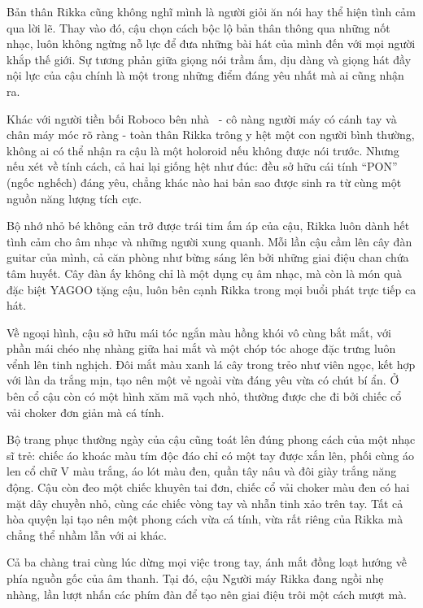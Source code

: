 \documentclass[../main.tex]{subfiles}
\begin{document}
Bản thân Rikka cũng không nghĩ mình là người giỏi ăn nói hay thể hiện tình cảm qua lời lẽ. Thay vào đó, cậu chọn cách bộc lộ bản thân thông qua những nốt nhạc, luôn không ngừng nỗ lực để đưa những bài hát của mình đến với mọi người khắp thế giới. Sự tương phản giữa giọng nói trầm ấm, dịu dàng và giọng hát đầy nội lực của cậu chính là một trong những điểm đáng yêu nhất mà ai cũng nhận ra.

Khác với người tiền bối Roboco bên nhà \hll\ - cô nàng người máy có cánh tay và chân máy móc rõ ràng - toàn thân Rikka trông y hệt một con người bình thường, không ai có thể nhận ra cậu là một holoroid nếu không được nói trước. Nhưng nếu xét về tính cách, cả hai lại giống hệt như đúc: đều sở hữu cái tính ``PON'' (ngốc nghếch) đáng yêu, chẳng khác nào hai bản sao được sinh ra từ cùng một nguồn năng lượng tích cực.

Bộ nhớ nhỏ bé không cản trở được trái tim ấm áp của cậu, Rikka luôn dành hết tình cảm cho âm nhạc và những người xung quanh. Mỗi lần cậu cầm lên cây đàn guitar của mình, cả căn phòng như bừng sáng lên bởi những giai điệu chan chứa tâm huyết. Cây đàn ấy không chỉ là một dụng cụ âm nhạc, mà còn là món quà đặc biệt YAGOO tặng cậu, luôn bên cạnh Rikka trong mọi buổi phát trực tiếp ca hát.

Về ngoại hình, cậu sở hữu mái tóc ngắn màu hồng khói vô cùng bắt mắt, với phần mái chéo nhẹ nhàng giữa hai mắt và một chóp tóc ahoge đặc trưng luôn vểnh lên tinh nghịch. Đôi mắt màu xanh lá cây trong trẻo như viên ngọc, kết hợp với làn da trắng mịn, tạo nên một vẻ ngoài vừa đáng yêu vừa có chút bí ẩn. Ở bên cổ cậu còn có một hình xăm mã vạch nhỏ, thường được che đi bởi chiếc cổ vải choker đơn giản mà cá tính.

Bộ trang phục thường ngày của cậu cũng toát lên đúng phong cách của một nhạc sĩ trẻ: chiếc áo khoác màu tím độc đáo chỉ có một tay được xắn lên, phối cùng áo len cổ chữ V màu trắng, áo lót màu đen, quần tây nâu và đôi giày trắng năng động. Cậu còn đeo một chiếc khuyên tai đơn, chiếc cổ vải choker màu đen có hai mặt dây chuyền nhỏ, cùng các chiếc vòng tay và nhẫn tinh xảo trên tay. Tất cả hòa quyện lại tạo nên một phong cách vừa cá tính, vừa rất riêng của Rikka mà chẳng thể nhầm lẫn với ai khác.

\chrint

Cả ba chàng trai cùng lúc dừng mọi việc trong tay, ánh mắt đồng loạt hướng về phía nguồn gốc của âm thanh. Tại đó, cậu Người máy Rikka đang ngồi nhẹ nhàng, lần lượt nhấn các phím đàn để tạo nên giai điệu trôi một cách mượt mà.
\end{document}
